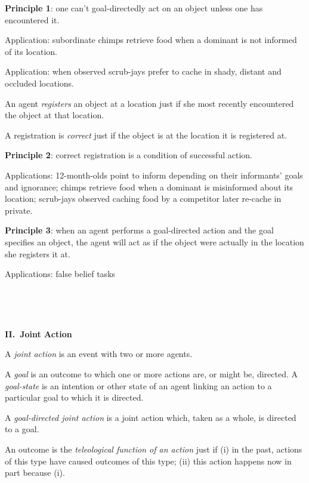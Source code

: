 \documentclass[11pt]{extarticle}
\begin{document}
\begin{multicols}{3}
\textbf{Principle 1}: one can’t goal-directedly act on an object unless one has encountered it.

Application: subordinate chimps retrieve food when a dominant is not informed of its location.\citep{Hare:2001ph}

Application: when observed scrub-jays prefer to cache in shady, distant and occluded locations.\citep{Dally:2004xf,Clayton:2007fh}

An agent \emph{registers} an object at a location just if she most recently encountered the object at that location.

A registration is \emph{correct} just if the object is at the location it is registered at.

\textbf{Principle 2}: correct registration is a condition of successful action.

Applications: 12-month-olds point to inform depending on their informants’ goals and ignorance;\citep{Liszkowski:2008al} chimps retrieve food when a dominant is misinformed about its location;\citep{Hare:2001ph} scrub-jays observed caching food by a competitor later re-cache in private.\citep{Clayton:2007fh,Emery:2007ze}

 
\textbf{Principle 3}: when an agent performs a goal-directed action and the goal specifies an object, the agent will act as if the object were actually in the location she registers it at.

Applications: false belief tasks \citep{Onishi:2005hm,Southgate:2007js,Buttelmann:2009gy}

\

\

\begin{center}
{\Large
\textbf{II.\ Joint Action}
}
\end{center}




A \emph{joint action} is an event with two or more agents.\citep%
{ludwig_collective_2007}

A \emph{goal} is an outcome to which one or more actions are, or might be, directed.  A \emph{goal-state} is an intention or other state of an agent linking an action to a particular goal to which it is directed.

A \emph{goal-directed joint action} is a joint action which, taken as a whole, is directed to a goal.

An outcome is the \emph{teleological function of an action} just if (i) in the past, actions of this type have caused outcomes of this type; (ii) this action happens now in part because (i).



\end{multicols}
\end{document}
